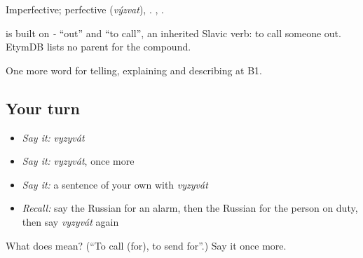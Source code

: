 Imperfective; perfective \emph{} (\emph{výzvat}), \emph{}. \emph{ }, \emph{}.

\begin{cousinweb}
\emph{} is built on \emph{-} \textquotedblleft{}out\textquotedblright{} and \emph{} \textquotedblleft{}to call\textquotedblright{}, an inherited Slavic verb: to call someone out. EtymDB lists no parent for the compound.
\end{cousinweb}

\begin{grammarlens}[title={What you've built}]
One more word for telling, explaining and describing at B1.
\end{grammarlens}

\subsection*{Your turn}
\begin{itemize}
\raggedright
  \item \emph{Say it:} \emph{vyzyvát}
  \item \emph{Say it:} \emph{vyzyvát}, once more
  \item \emph{Say it:} a sentence of your own with \emph{vyzyvát}
  \item \emph{Recall:} say the Russian for an alarm, then the Russian for the person on duty, then say \emph{vyzyvát} again
\end{itemize}

\begin{tcolorbox}[breakable,colback=teal!4,colframe=teal!35!black,title={Before you move on}]
What does  mean? (\textquotedblleft{}To call (for), to send for\textquotedblright{}.) Say it once more.
\end{tcolorbox}
